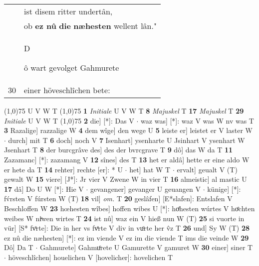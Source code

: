 \documentclass[8pt,a4paper,notitlepage]{article}
\begin{document}
\begin{table}[ht]
\begin{minipage}[t]{0.5\linewidth}
\begin{tabular}{rl}
 & ist disem ritter undertân,\\ 
 & ob \textbf{ez nû} \textbf{die} \textbf{næhesten} wellent lân."\\ 
 & \begin{large}D\end{large}ô wart gevolget Gahmurete\\ 
30 & einer höveschlîchen bete:\\ 
\end{tabular}
\scriptsize
\line(1,0){75} \newline
U V W T \newline
\line(1,0){75} \newline
\textbf{1} \textit{Initiale} U V W T  \textbf{8} \textit{Majuskel} T  \textbf{17} \textit{Majuskel} T  \textbf{29} \textit{Initiale} U V W T  \newline
\line(1,0){75} \newline
\textbf{2} die] [*]: Das V  $\cdot$ waz was] [*]: waz V was W nv was T \textbf{3} Razalige] razzalige W \textbf{4} dem wîge] den wege U \textbf{5} leiste er] leistet er V laster W  $\cdot$ durch] mit T \textbf{6} doch] noch V \textbf{7} Isenhart] ysenharte U Jsinhart V ysenhart W Jsenhart T \textbf{8} der burcgrâve des] des der bvrcgrave T \textbf{9} dô] das W da T \textbf{11} Zazamanc] [*]: zazamang V \textbf{12} sînes] des T \textbf{13} het er aldâ] hette er eine aldo W er hete da T \textbf{14} rehter] rechte [er]: * U  $\cdot$ het] hat W T  $\cdot$ ervalt] geualt V (T) gewalt W \textbf{15} viere] [J*]: Jr vier V Zwene W in vier T \textbf{16} almeistic] al mastic U \textbf{17} dâ] Do U W [*]: Hie V  $\cdot$ gevangener] gevanger U geuangen V  $\cdot$ künige] [*]: fv́rsten V fúrsten W (T) \textbf{18} vil] \textit{om.} T \textbf{20} geslâfen] [E*slafen]: Entslafen V Beschloffen W \textbf{23} hœhesten wîbes] hoffen wibes U [*]: hoͤhesten wúrtes V hoͤchten weibes W niͮwen wirtes T \textbf{24} ist nû] waz ein V hieß nun W (T) \textbf{25} si vuorte in vür] [S* fvͦrte]: Die in her vs fvͦrte V div in vuͦrte her v̂z T \textbf{26} und] Sy W (T) \textbf{28} ez nû die næhesten] [*]: ez im viende V ez im die viende T ims die veinde W \textbf{29} Dô] Da T  $\cdot$ Gahmurete] Gahmuͦrete U Gamurette V gamuret W \textbf{30} einer] siner T  $\cdot$ höveschlîchen] houelichen V [hovelicher]: hovelichen T \newline
\end{minipage}
\end{table}
\end{document}
